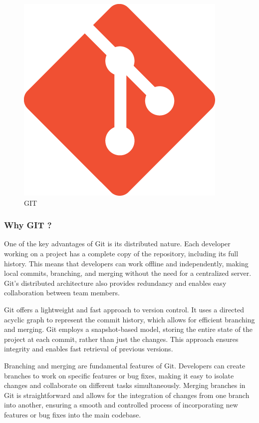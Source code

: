 \documentclass[
12pt,
oneside, 
onehalfspacing, 
nolistspacing, 
parskip, 
chapterinoneline, 
]{AASTCOMPUTER}
\begin{document}
\begin{figure}[!ht]
	\centering
	\includegraphics[scale=0.5]{Figures/DevOps/GIT.png}
  	\caption{GIT}
  	\label{fig:GIT}
\end{figure}

\subsubsection{Why GIT ?}

One of the key advantages of Git is its distributed nature. Each developer working on a project has a complete copy of the repository, including its full history. This means that developers can work offline and independently, making local commits, branching, and merging without the need for a centralized server. Git's distributed architecture also provides redundancy and enables easy collaboration between team members.

Git offers a lightweight and fast approach to version control. It uses a directed acyclic graph to represent the commit history, which allows for efficient branching and merging. Git employs a snapshot-based model, storing the entire state of the project at each commit, rather than just the changes. This approach ensures integrity and enables fast retrieval of previous versions.

Branching and merging are fundamental features of Git. Developers can create branches to work on specific features or bug fixes, making it easy to isolate changes and collaborate on different tasks simultaneously. Merging branches in Git is straightforward and allows for the integration of changes from one branch into another, ensuring a smooth and controlled process of incorporating new features or bug fixes into the main codebase.
\end{document}
